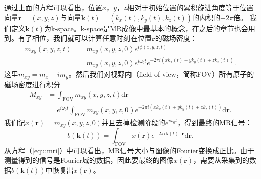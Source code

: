 通过上面的方程可以看出，位置$x$，$y$，$z$相对于初始位置的累积旋进角度等于位置向量$\mathrm{\textbf{r}}=(x,y,z)$与向量$\mathrm{\textbf{k}}(t)=(k_x(t),k_y(t),k_z(t))$的内积的$-2\pi$倍。
我们定义$\mathrm{\textbf{k}}(t)$为k-space。k-space是MR成像中最基本的概念，在之后的章节也会用到。有了相位，我们就可以计算任意时刻在位置$\mathrm{\textbf{r}}$的磁场密度：
\begin{equation}
	\begin{aligned}
		m_{xy}(x,y,z,t)&=m_{xy}(x,y,z,0)e^{i\phi(x,y,z,t)} \\
&=m_{xy}(x,y,z,0)e^{i\omega_0t}e^{-2\pi i(xk_x(t)+yk_y(t)+zk_z(t))}.
	\end{aligned}
\end{equation}
这里$m_{xy}=m_x+im_y$。然后我们对视野内（field of view，简称FOV）所有原子的磁场密度进行积分
\begin{equation}
	\begin{aligned}
		M_{xy}&=\int_{\mathrm{FOV}}m_{xy}(x,y,z,t)\mathrm{d}\mathrm{\textbf{r}} \\
&=e^{i\omega_0t}\int_{\mathrm{FOV}}m_{xy}(x,y,z,0)e^{-2\pi i(xk_x(t)+yk_y(t)+zk_z(t))}\mathrm{d}\mathrm{\textbf{r}}.
	\end{aligned}
\end{equation}
我们记$x(\mathrm{\textbf{r}})=m_{xy}(x,y,z,0)$并且去掉检测阶段的$e^{i\omega_0t}$，得到最终的MR信号：
\begin{equation}
	b(\mathrm{\textbf{k}}(t)) = \int_{\mathrm{FOV}}x(\mathrm{\textbf{r}})e^{-2\pi i\mathrm{\textbf{k}}(t) \cdot \mathrm{\textbf{r}}}\mathrm{d}\mathrm{\textbf{r}}.
	\label{equ:mri}
\end{equation}
从方程（\ref{equ:mri}）中可以看出，MR信号大小与图像的Fourier变换成正比。由于测量得到的信号是Fourier域的数据，因此要最终的图像$x(\mathrm{\textbf{r}})$，需要从采集到的数据$b(\mathrm{\textbf{k}}(t))$中恢复出$x(\mathrm{\textbf{r}})$。

